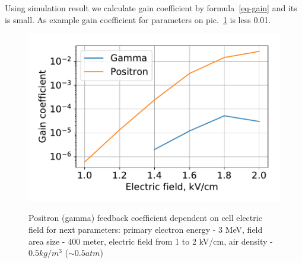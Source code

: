 \documentclass{webofc}
\begin{document}
Using simulation result we calculate gain coefficient by formula~\ref{eq-gain} and its is small. As example gain coefficient for parameters on pic.~\ref{pic-gain-a} is less 0.01.
\begin{figure}[ht!]
\begin{center}
\includegraphics[width=0.5\linewidth]{pictures/08_gain}
        \label{pic-gain-a}
         \caption{Positron (gamma) feedback coefficient dependent on cell electric field for next parameters: primary electron energy - 3 MeV, field area size - 400 meter, electric field from 1 to 2 kV/cm, air density - $0.5 kg/m^3$ ($\sim 0.5 atm$)}
\end{center}
    	
   \end{figure}
         
\end{document}
